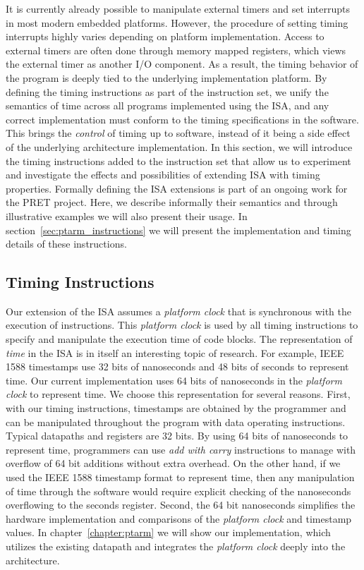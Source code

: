It is currently already possible to manipulate external timers and set interrupts in most modern embedded platforms.
However, the procedure of setting timing interrupts highly varies depending on platform implementation.
Access to external timers are often done through memory mapped registers, which views the external timer as another I/O component.
As a result, the timing behavior of the program is deeply tied to the underlying implementation platform.
By defining the timing instructions as part of the instruction set, we unify the semantics of time across all programs implemented using the ISA, and any correct implementation must conform to the timing specifications in the software.
This brings the \emph{control} of timing up to software, instead of it being a side effect of the underlying architecture implementation.  
In this section, we will introduce the timing instructions added to the instruction set that allow us to experiment and investigate the effects and possibilities of extending ISA with timing properties.
Formally defining the ISA extensions is part of an ongoing work for the PRET project.
Here, we describe informally their semantics and through illustrative examples we will also present their usage. 
In section~\ref{sec:ptarm_instructions} we will present the implementation and timing details of these instructions.

\subsection{Timing Instructions}
Our extension of the ISA assumes a \emph{platform clock} that is synchronous with the execution of instructions.
This \emph{platform clock} is used by all timing instructions to specify and manipulate the execution time of code blocks.
The representation of \emph{time} in the ISA is in itself an interesting topic of research.
For example, IEEE 1588 timestamps use 32 bits of nanoseconds and 48 bits of seconds to represent time.    
Our current implementation uses 64 bits of nanoseconds in the \emph{platform clock} to represent time. 
We choose this representation for several reasons. 
First, with our timing instructions, timestamps are obtained by the programmer and can be manipulated throughout the program with data operating instructions.
Typical datapaths and registers are 32 bits. 
By using 64 bits of nanoseconds to represent time, programmers can use \emph{add with carry} instructions to manage with overflow of 64 bit additions without extra overhead. 
On the other hand, if we used the IEEE 1588 timestamp format to represent time, then any manipulation of time through the software would require explicit checking of the nanoseconds overflowing to the seconds register.
Second, the 64 bit nanoseconds simplifies the hardware implementation and comparisons of the \emph{platform clock} and timestamp values.
In chapter~\ref{chapter:ptarm} we will show our implementation, which utilizes the existing datapath and integrates the \emph{platform clock} deeply into the architecture. 

